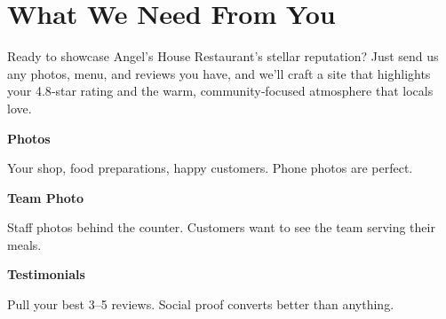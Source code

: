 \documentclass[11pt,letterpaper]{article}
\begin{document}
\vspace{0.2em}

\section*{What We Need From You}

Ready to showcase Angel's House Restaurant's stellar reputation? Just send us any photos, menu, and reviews you have, and we'll craft a site that highlights your 4.8‑star rating and the warm, community‑focused atmosphere that locals love.

\vspace{0.12em}

\noindent\begin{minipage}[t]{0.48\textwidth}
\begin{tcolorbox}[colframe=accent-teal, boxrule=1pt, left=0.7em, right=0.7em, top=0.5em, bottom=0.5em, arc=4pt, boxsep=0pt]
{\bfseries\small\color{accent-teal}Photos}

\vspace{0.15em}

{\small Your shop, food preparations, happy customers. Phone photos are perfect.}
\end{tcolorbox}

\vspace{0.1em}

\begin{tcolorbox}[colframe=accent-teal, boxrule=1pt, left=0.7em, right=0.7em, top=0.5em, bottom=0.5em, arc=4pt, boxsep=0pt]
{\bfseries\small\color{accent-teal}Team Photo}

\vspace{0.15em}

{\small Staff photos behind the counter. Customers want to see the team serving their meals.}
\end{tcolorbox}

\vspace{0.1em}

\begin{tcolorbox}[colframe=accent-teal, boxrule=1pt, left=0.7em, right=0.7em, top=0.5em, bottom=0.5em, arc=4pt, boxsep=0pt]
{\bfseries\small\color{accent-teal}Testimonials}

\vspace{0.15em}

{\small Pull your best 3--5 reviews. Social proof converts better than anything.}
\end{tcolorbox}
\end{minipage}
\hfill
\end{document}

